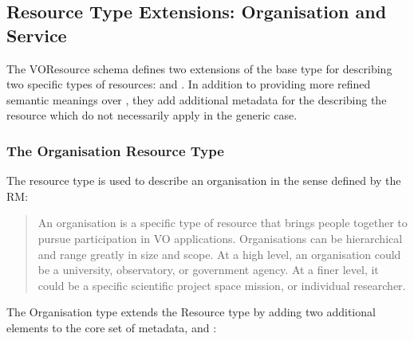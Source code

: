 \documentclass[11pt,a4paper]{ivoa}
\begin{document}

\subsection{Resource Type Extensions:  Organisation and Service}

The VOResource schema defines two extensions of the base
 type for describing two specific types of
resources:   and .  In
addition to providing more refined semantic meanings over
, they add additional metadata for the
describing the resource which do not necessarily apply in the generic
case. 



\subsubsection{The Organisation Resource Type}


The  resource type is used to describe an organisation in
the sense defined by the RM:


\begin{quotation}
An organisation is a specific type of resource that brings people
together to pursue participation in VO applications.  Organisations
can be hierarchical and range greatly in size and scope.  At a high
level, an organisation could be a university, observatory, or
government agency.  At a finer level, it could be a specific
scientific project space mission, or individual researcher.  
\end{quotation}


The Organisation type extends the Resource type by adding two additional
elements to the core set of metadata,  and
:
\end{document}
